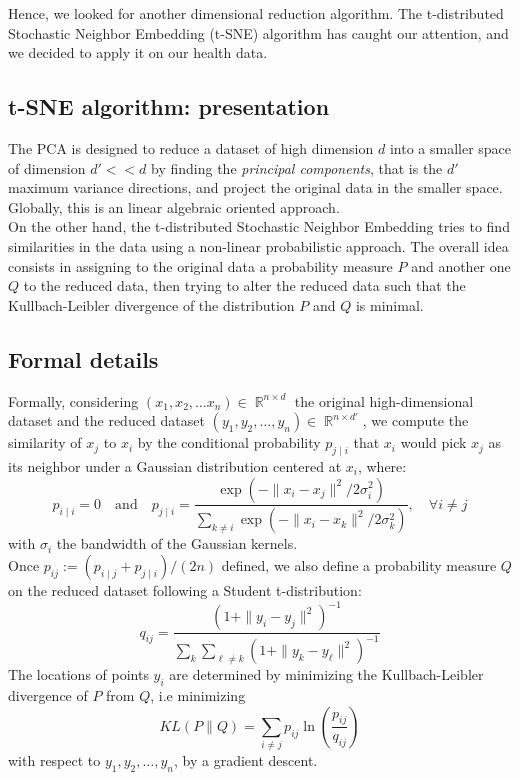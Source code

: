 \documentclass[]{article}
\DeclareMathOperator*{\R}{\mathbb{R}}
\begin{document}
\noindent
Hence, we looked for another dimensional reduction algorithm. The t-distributed Stochastic Neighbor Embedding (t-SNE) algorithm has caught our attention, and we decided to apply it on our health data.

\subsection{t-SNE algorithm: presentation}
The PCA is designed to reduce a dataset of high dimension $d$ into a smaller space of dimension $d'<\!<d$ by finding the \textit{principal components}, that is the $d'$ maximum variance directions, and project the original data in the smaller space. Globally, this is an linear algebraic oriented approach.\\
On the other hand, the t-distributed Stochastic Neighbor Embedding tries to find similarities in the data using a non-linear probabilistic approach. The overall idea consists in assigning to the original data a probability measure $P$ and another one $Q$ to the reduced data, then trying to alter the reduced data such that the Kullbach-Leibler divergence of the distribution $P$ and $Q$ is minimal.
\subsection{Formal details}
Formally, considering $(x_1, x_2,\dots x_n) \in \R^{n\times d}$ the original high-dimensional dataset and the reduced dataset $(y_1,y_2,\dots, y_n)\in \R^{n\times d'}$, we compute the similarity of $x_j$ to $x_i$ by the conditional probability $p_{j\mid i}$ that $x_i$ would pick $x_j$ as its neighbor under a Gaussian distribution centered at $x_i$, where:
\begin{equation}
	p_{i\mid i} = 0\quad \text{and}\quad
	p_{j\mid i} = \frac{\exp(-\|x_i - x_j\|^2/2\sigma_i^2)}{\sum_{k\ne i}\exp(-\|x_i - x_k\|^2/2\sigma_k^2)}, \quad \forall i\ne j
\end{equation}
with $\sigma_i$ the bandwidth of the Gaussian kernels.\\
Once $p_{ij} := (p_{i\mid j} + p_{j\mid i})/(2n)$ defined, we also define a probability measure $Q$ on the reduced dataset following a Student t-distribution:
\begin{equation}
	q_{ij} = \frac{(1+\|y_i-y_j\|^2)^{-1}}{\sum_k \sum_{\ell \ne k}	(1+\|y_k-y_{\ell}\|^2)^{-1}}
\end{equation}
The locations of points $y_i$ are determined by minimizing the Kullbach-Leibler divergence of $P$ from $Q$, i.e minimizing
\begin{equation}
	KL(P\|Q) = \sum_{i\ne j}p_{ij} \ln\left(\frac{p_{ij}}{q_{ij}}\right)
\end{equation}
with respect to $y_1,y_2,\dots, y_n$, by a gradient descent.
\end{document}
